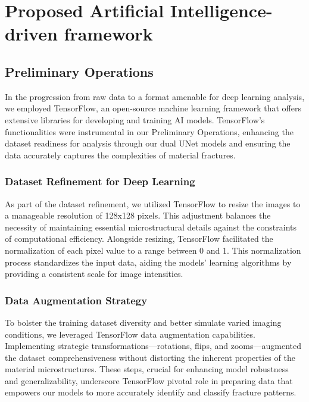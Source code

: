 \documentclass[preprint,12pt]{elsarticle}
\begin{document}
\vspace{\baselineskip}
\vspace{\baselineskip}
\vspace{\baselineskip}




\section{Proposed Artificial Intelligence-driven framework}
\label{Sec: Proposed Artificial intelligence-driven framework}
\subsection{Preliminary Operations}
\label{sec:prelimnary_operations}

In the progression from raw data to a format amenable for deep learning analysis, we employed TensorFlow, an open-source machine learning framework that offers extensive libraries for developing and training AI models. TensorFlow's functionalities were instrumental in our Preliminary Operations, enhancing the dataset readiness for analysis through our dual UNet models and ensuring the data accurately captures the complexities of material fractures.

\subsubsection{Dataset Refinement for Deep Learning}
As part of the dataset refinement, we utilized TensorFlow to resize the images to a manageable resolution of 128x128 pixels. This adjustment balances the necessity of maintaining essential microstructural details against the constraints of computational efficiency. Alongside resizing, TensorFlow facilitated the normalization of each pixel value to a range between 0 and 1. This normalization process standardizes the input data, aiding the models' learning algorithms by providing a consistent scale for image intensities.

\subsubsection{Data Augmentation Strategy}
To bolster the training dataset diversity and better simulate varied imaging conditions, we leveraged TensorFlow data augmentation capabilities. Implementing strategic transformations—rotations, flips, and zooms—augmented the dataset comprehensiveness without distorting the inherent properties of the material microstructures. These steps, crucial for enhancing model robustness and generalizability, underscore TensorFlow pivotal role in preparing data that empowers our models to more accurately identify and classify fracture patterns.
\end{document}
